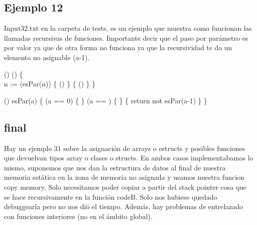 \newpage

\subsection{Ejemplo 12}
Input32.txt en la carpeta de tests, es un ejemplo que muestra como funcionan las llamadas recursivas de funciones. Importante decir que el paso por par\'{a}metro es por valor ya que de otra forma no funciona ya que la recursividad te da un elemento no asignable (a-1).


\begin{algorithm}

	\Void() () \{ \\
	\quad {} n := \;
	\quad {}(esPar(n)) \{
	\quad \quad {}()\;	
	\quad \}	 \{
	\quad \quad {}()\;
	\quad \}
	\}\;
	
	(\Val {}) esPar(a) \{
	\quad {}(a == 0) \{
	\quad \quad {}  \;
	\quad \}  (a == ) \{
	\quad \quad {} \;
	\quad \}  \{
	\quad \quad return not esPar(a-1) \;
	\quad \}
	\}
	
\end{algorithm}


\subsection{final}
Hay un ejemplo 31 sobre la asignaci\'{o}n de arrays o estructs y posibles funciones que devuelvan tipos array o clases o structs. En ambos casos implementabamos lo mismo, suponemos que nos dan la estructura de datos al final de nuestra memoria est\'{a}tica en la zona de memoria no asignada y usamos nuestra funcion copy memory. Solo necesitamos poder copiar a partir del stack pointer cosa que se hace recursivamente en la funci\'{o}n codeB. Solo nos hubiese quedado debuggearla pero no nos di\'{o} el tiempo. Adem\'{a}s,
    hay problemas de entrelazado con funciones interiores (no en el \'{a}mbito global).










